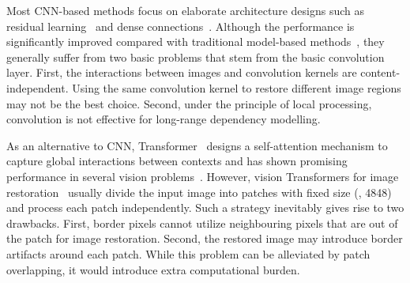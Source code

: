 \documentclass[10pt,twocolumn,letterpaper]{article}
\newlength \g
\begin{document}
Most CNN-based methods focus on elaborate architecture designs such as residual learning~\cite{ledig2017srresnet, lim2017edsr} and dense connections~\cite{zhang2018RDN, wang2018esrgan}. Although the performance is significantly improved compared with traditional model-based methods~\cite{timofte2014a, dabov2007bm3d,gu2012fast}, they generally suffer from two basic problems that stem from the basic convolution layer. First, the interactions between images and convolution kernels are content-independent. Using the same convolution kernel to restore different image regions may not be the best choice. Second, under the principle of local processing, convolution is not effective for long-range dependency modelling.




As an alternative to CNN, Transformer~\cite{vaswani2017transformer} designs a self-attention mechanism to capture global interactions between contexts and has shown promising performance in several vision problems~\cite{carion2020DETR, touvron2020DeiT, dosovitskiy2020ViT, liu2021swin}. 
However, vision Transformers for image restoration~\cite{chen2021IPT, cao2021videosr} usually divide the input image into patches with fixed size (\eg, 4848) and process each patch independently. Such a strategy inevitably gives rise to two drawbacks. First, border pixels cannot utilize neighbouring pixels that are out of the patch for image restoration. Second, the restored image may introduce border artifacts around each patch. While this problem can be alleviated by patch overlapping, it would introduce extra computational burden.
\end{document}
